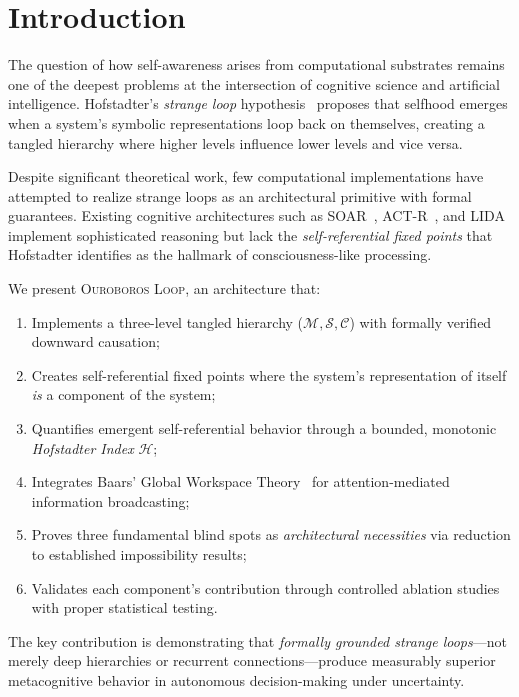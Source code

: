 \documentclass[11pt,a4paper]{article}
\newcommand{\OL}{\textsc{Ouroboros Loop}}
\newcommand{\HI}{\mathcal{H}}  %
\newcommand{\SM}{\mathcal{S}}  %
\newcommand{\WM}{\mathcal{M}}  %
\newcommand{\MC}{\mathcal{C}}  %
\begin{document}
\section{Introduction}
\label{sec:introduction}

The question of how self-awareness arises from computational substrates
remains one of the deepest problems at the intersection of cognitive
science and artificial intelligence. Hofstadter's \emph{strange loop}
hypothesis~\citep{hofstadter1979geb, hofstadter2007loop} proposes that
selfhood emerges when a system's symbolic representations loop back on
themselves, creating a tangled hierarchy where higher levels influence
lower levels and vice versa.

Despite significant theoretical work, few computational implementations
have attempted to realize strange loops as an architectural primitive
with formal guarantees. Existing cognitive architectures such as
SOAR~\citep{laird1987soar}, ACT-R~\citep{anderson2004act}, and
LIDA~\citep{franklin2014lida} implement sophisticated reasoning but
lack the \emph{self-referential fixed points} that Hofstadter identifies
as the hallmark of consciousness-like processing.

We present \OL{}, an architecture that:
\begin{enumerate}[leftmargin=2em]
  \item Implements a three-level tangled hierarchy ($\WM, \SM, \MC$)
        with formally verified downward causation;
  \item Creates self-referential fixed points where the system's
        representation of itself \emph{is} a component of the system;
  \item Quantifies emergent self-referential behavior through a bounded,
        monotonic \emph{Hofstadter Index} $\HI$;
  \item Integrates Baars' Global Workspace Theory~\citep{baars1988cognitive}
        for attention-mediated information broadcasting;
  \item Proves three fundamental blind spots as \emph{architectural
        necessities} via reduction to established impossibility results;
  \item Validates each component's contribution through controlled
        ablation studies with proper statistical testing.
\end{enumerate}

The key contribution is demonstrating that \emph{formally grounded
strange loops}---not merely deep hierarchies or recurrent connections---produce
measurably superior metacognitive behavior in autonomous decision-making
under uncertainty.
\end{document}
